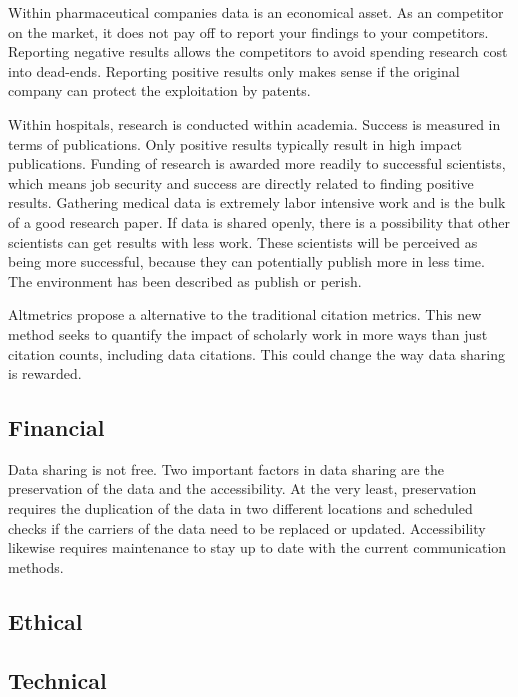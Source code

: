 Within pharmaceutical companies data is an economical asset. As an
competitor on the market, it does not pay off to report your findings
to your competitors. Reporting negative results allows the competitors
to avoid spending research cost into dead-ends. Reporting positive
results only makes sense if the original company can protect the
exploitation by patents.

Within hospitals, research is conducted within
academia. Success is measured in terms of
publications. Only positive results typically result in high impact
publications. Funding of research is awarded more readily to successful
scientists, which means job security and success are directly related
to finding positive results. Gathering medical data is extremely labor
intensive work and is the bulk of a good research paper. If data is
shared openly, there is a possibility that other scientists can get
results with less work. These scientists will be perceived as being
more successful, because they can potentially publish more in less
time. The environment has been described as publish or
perish.

Altmetrics\cite{Altmetrics} propose a
alternative to the traditional citation metrics. This new method seeks
to quantify the impact of scholarly work in more ways than just
citation counts, including data citations. This could change the way
data sharing is rewarded.

\subsection{Financial}

Data sharing is not free. Two important factors in data sharing are
the preservation of the data and the accessibility. At the very least,
preservation requires the duplication of the data in two different
locations and scheduled checks if the carriers of the data need to be
replaced or updated. Accessibility likewise requires maintenance to
stay up to date with the current communication methods.

\subsection{Ethical}

\subsection{Technical}
